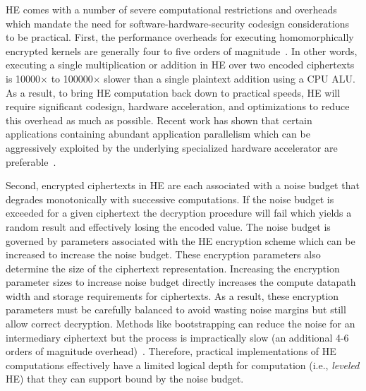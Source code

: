 HE comes with a number of severe computational restrictions and overheads which mandate the need for software-hardware-security codesign considerations to be practical.
First, the performance overheads for executing homomorphically encrypted kernels are generally four to five orders of magnitude~\cite{gentry2011implementing}.
In other words, executing a single multiplication or addition in HE over two encoded ciphertexts is 10000$\times$ to 100000$\times$ slower than a single plaintext addition using a CPU ALU.
As a result, to bring HE computation back down to practical speeds, HE will require significant codesign, hardware acceleration, and optimizations to reduce this overhead as much as possible.
Recent work has shown that certain applications containing abundant application parallelism which can be aggressively exploited by the underlying specialized hardware accelerator are preferable~\cite{heax, cheetah}.

Second, encrypted ciphertexts in HE are each associated with a noise budget that degrades monotonically with successive computations.
If the noise budget is exceeded for a given ciphertext the decryption procedure will fail which yields a random result and effectively losing the encoded value.
The noise budget is governed by parameters associated with the HE encryption scheme which can be increased to increase the noise budget.
These encryption parameters also determine the size of the ciphertext representation.
Increasing the encryption parameter sizes to increase noise budget directly increases the compute datapath width and storage requirements for ciphertexts.
As a result, these encryption parameters must be carefully balanced to avoid wasting noise margins but still allow correct decryption.
Methods like bootstrapping can reduce the noise for an intermediary ciphertext but the process is impractically slow (an additional 4-6 orders of magnitude overhead)~\cite{sgx-he}.
Therefore, practical implementations of HE computations effectively have a limited logical depth for computation (i.e., \textit{leveled} HE) that they can support bound by the noise budget.

